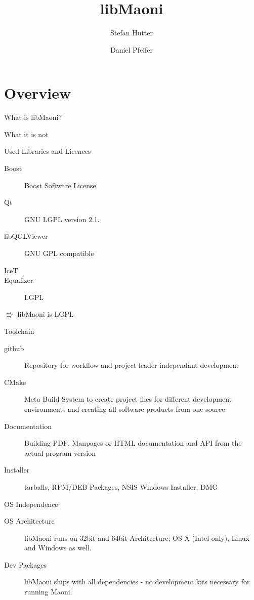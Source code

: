 \documentclass[paper=screen,orient=landscape,style=aggie]{powerdot}
\title{libMaoni}
\author{Stefan Hutter \and Daniel Pfeifer}
\begin{document}
\maketitle

\section{Overview}

\begin{slide}{What is libMaoni?}
\end{slide}

\begin{slide}{What it is not}
\end{slide}

\begin{slide}{Used Libraries and Licences}
	\begin{description}
		\item[Boost] Boost Software License
		\item[Qt] GNU LGPL version 2.1.
		\item[libQGLViewer] GNU GPL compatible
		\item[IceT]
		\item[Equalizer] LGPL
	\end{description}
	$ \Rrightarrow $ libMaoni is LGPL
\end{slide}

\begin{slide}{Toolchain}
\begin{description}
	\item[github] Repository for workflow and project leader independant development
	\item[CMake] Meta Build System to create project files for different development environments and creating all software products from one source
	\item[Documentation] Building PDF, Manpages or HTML documentation and API from the actual program version 
	\item[Installer] tarballs, RPM/DEB Packages, NSIS Windows Installer, DMG
\end{description}
\end{slide}

\begin{slide}{OS Independence}
\begin{description}
	\item[OS Architecture] libMaoni runs on 32bit and 64bit Architecture; OS X (Intel only), Linux and Windows as well.
	\item[Dev Packages] libMaoni ships with all dependencies - no development kits necessary for running Maoni.
\end{description}
\end{slide}
\end{document}
